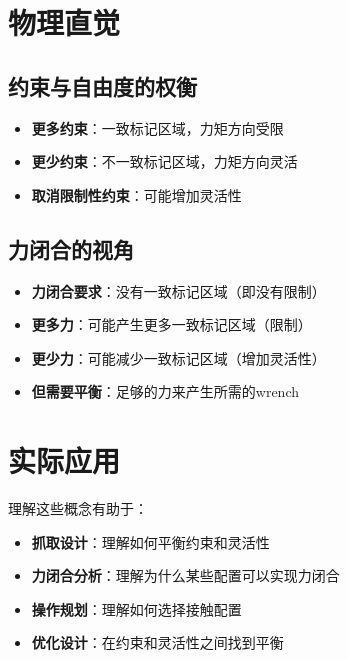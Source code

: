 \documentclass[12pt,a4paper]{article}
\begin{document}
\section{物理直觉}

\subsection{约束与自由度的权衡}

\begin{itemize}
    \item \textbf{更多约束}：一致标记区域，力矩方向受限
    \item \textbf{更少约束}：不一致标记区域，力矩方向灵活
    \item \textbf{取消限制性约束}：可能增加灵活性
\end{itemize}

\subsection{力闭合的视角}

\begin{itemize}
    \item \textbf{力闭合要求}：没有一致标记区域（即没有限制）
    \item \textbf{更多力}：可能产生更多一致标记区域（限制）
    \item \textbf{更少力}：可能减少一致标记区域（增加灵活性）
    \item \textbf{但需要平衡}：足够的力来产生所需的wrench
\end{itemize}

\section{实际应用}

理解这些概念有助于：

\begin{itemize}
    \item \textbf{抓取设计}：理解如何平衡约束和灵活性
    \item \textbf{力闭合分析}：理解为什么某些配置可以实现力闭合
    \item \textbf{操作规划}：理解如何选择接触配置
    \item \textbf{优化设计}：在约束和灵活性之间找到平衡
\end{itemize}
\end{document}
